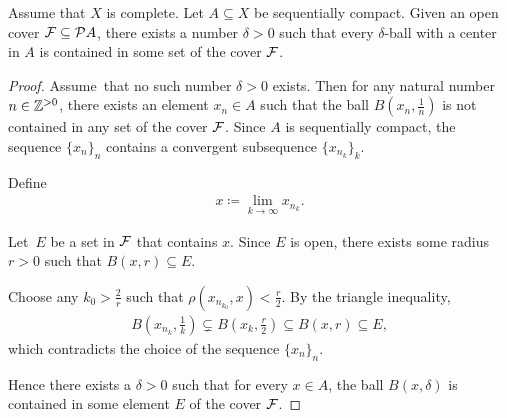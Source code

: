 \begin{lemma}\label{thm:lebesgue_covering_lemma}
  Assume that $X$ is complete. Let $A \subseteq X$ be sequentially compact. Given an open cover $\mathcal{F} \subseteq \mathcal{P} A$, there exists a number $\delta > 0$ such that every $\delta$-ball with a center in $A$ is contained in some set of the cover $\mathcal{F}$.
\end{lemma}
\begin{proof}
  Assume\LEM\ that no such number $\delta > 0$ exists. Then for any natural number $n \in \mathbb{Z}^{>0}$, there exists an element $x_n \in A$ such that the ball $B(x_n, \frac 1 n)$ is not contained in any set of the cover $\mathcal{F}$. Since $A$ is sequentially compact, the sequence $\{ x_n \}_n$ contains a convergent subsequence $\{ x_{n_k} \}_k$.

  Define
  \begin{align*}
    x \coloneqq \lim_{k \to \infty} x_{n_k}.
  \end{align*}

  Let\AOC\ $E$ be a set in $\mathcal{F}$ that contains $x$. Since $E$ is open, there exists some radius $r > 0$ such that $B(x, r) \subseteq E$.

  Choose any $k_0 > \frac 2 r$ such that $\rho(x_{n_{k_0}}, x) < \frac r 2$. By the triangle inequality,
  \begin{align*}
    B \left(x_{n_k}, \frac 1 k \right) \subsetneq B \left(x_k, \frac r 2 \right) \subseteq B(x, r) \subseteq E,
  \end{align*}
  which contradicts the choice of the sequence $\{ x_n \}_n$.

  Hence there exists a $\delta > 0$ such that for every $x \in A$, the ball $B(x, \delta)$ is contained in some element $E$ of the cover $\mathcal{F}$.
\end{proof}

